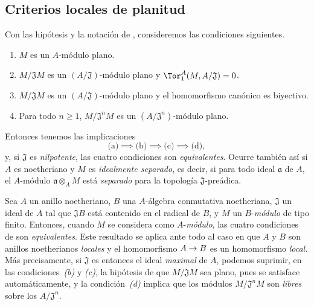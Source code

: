 \documentclass[oneside]{amsart}
\makeatletter
\renewcommand{\geq}{\geqslant}
\newcommand{\ega@arrow}[2]{\mathchoice{#1}{#2}{#2}{#2}}
\renewcommand{\to}{\ega@arrow{\longrightarrow}{\rightarrow}}
\newcommand{\oldpage}[2][]{{\marginnote{\normalfont\textbf{#1}~|~#2}}\ignorespaces}
\let\EGAOriginalLabel\label
\renewcommand{\label}[1]{\phantomsection\EGAOriginalLabel{#1}}
\makeatother
\begin{document}
\subsection{Criterios locales de planitud}
\label{subsection:0.10.2}

\begin{env}[10.2.1]
\label{0.10.2.1}
Con las hipótesis y la notación de , consideremos las condiciones siguientes.
\begin{enumerate}
  \item[(a)] $M$ es un $A$-módulo plano.
  \item[(b)] $M/\mathfrak{J}M$ es un $(A/\mathfrak{J})$-módulo plano y $\Tor_1^A(M,A/\mathfrak{J})=0$.
  \item[(c)] $M/\mathfrak{J}M$ es un $(A/\mathfrak{J})$-módulo plano y el homomorfismo canónico  es biyectivo.
  \item[(d)] Para todo $n\geq1$, $M/\mathfrak{J}^nM$ es un $(A/\mathfrak{J}^n)$-módulo plano.
\end{enumerate}

Entonces tenemos las implicaciones
\[
  \text{(a)}\implies\text{(b)}\implies\text{(c)}\implies\text{(d)},
\]
y, si $\mathfrak{J}$ es \emph{nilpotente}, las cuatro condiciones son \emph{equivalentes}.
Ocurre también así si $A$ es noetheriano y $M$ es \emph{idealmente separado}, es decir, si para todo ideal $\mathfrak{a}$ de $A$, el $A$-módulo $\mathfrak{a}\otimes_A M$ está \emph{separado} para la topología $\mathfrak{J}$-preádica.
\end{env}

\begin{env}[10.2.2]
\label{0.10.2.2}
Sea $A$ un anillo noetheriano, $B$ una $A$-álgebra conmutativa noetheriana, $\mathfrak{J}$ un ideal de $A$ tal que $\mathfrak{J}B$ está contenido en el radical de $B$, y $M$ un $B$-\emph{módulo} de tipo finito.
Entonces, cuando $M$ se considera como $A$-\emph{módulo}, las cuatro condiciones de  son \emph{equivalentes}.
\oldpage[0\textsubscript{III-1}]{19}
Este resultado se aplica ante todo al caso en que $A$ y $B$ son anillos noetherianos \emph{locales} y el homomorfismo $A\to B$ es un homomorfismo \emph{local}.
Más precisamente, si $\mathfrak{J}$ es entonces el ideal \emph{maximal} de $A$, podemos suprimir, en las condiciones~\emph{(b)} y \emph{(c)}, la hipótesis de que $M/\mathfrak{J}M$ sea plano, pues se satisface automáticamente, y la condición~\emph{(d)} implica que los módulos $M/\mathfrak{J}^nM$ son \emph{libres} sobre los $A/\mathfrak{J}^n$.
\end{env}
\end{document}
